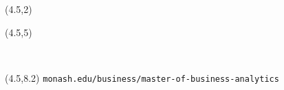 {
\begin{textblock}{7.5}(4.5,2)\fontsize{32}{36}\sf
{\color{white}\raggedright{}\par\inserttitle}
\end{textblock}
\begin{textblock}{7.5}(4.5,5)
{\color{white}\raggedright{\insertauthor}\\[0.2cm]
\insertdate}
\begin{textblock}{12}(4.5,8.2)
\color{grey}\fontsize{13}{13}\sf\texttt{monash.edu/business/master-of-business-analytics}
\end{textblock}
\end{textblock}
}

\graphicspath{{figs/}}
\def\full#1{\vspace*{0.2cm}\par\centerline{\texttt{[image: \#1]}}}

\usepackage{multicol}


\usepackage{media9}
\usepackage{multimedia}
\usepackage{animate}

\usepackage{graphicx}
\usepackage{tikz}
\usepackage[T1]{fontenc}
\usepackage{fontawesome}


\usetikzlibrary{shapes}
\usepackage{amsmath}
\usepackage{xspace}
\newcommand{\A}{\ensuremath{\mathcal{A}}\xspace}
\newcommand{\B}{\ensuremath{\mathcal{B}}\xspace}
\newcommand\pa[1]{\ensuremath{\left(#1\right)}}

\usetikzlibrary{calc}
\usepackage{forest}

\usepackage{tcolorbox}
\usepackage{color}


